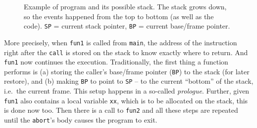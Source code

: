 \documentclass[10pt]{llncs}
\newcommand{\code}[2][]{\lstinline[columns=fullflexible, #1]$#2$}
\newcommand{\codeasm}[2][]{\code[language={[x86masm]Assembler},
	morekeywords={rbp,rsp},#1]{#2}}
\begin{document}
\begin{figure}[tb]
\begin{center}
  \end{center}

  \caption{Example of program and its possible stack. The stack grows down, so
    the events happened from the top to bottom (as well as the code).
    \code{SP} = current stack pointer, \code{BP} = current base/frame
    pointer.}
  \label{fig:stack_frame}
\end{figure}

More precisely, when \code{fun1} is called from \code{main}, the address of
the instruction right after the \codeasm{call} is stored on the stack to know
exactly where to return. And \code{fun1} now continues the execution.
Traditionally, the first thing a function performs is (a) storing the caller's
base/frame pointer (\code{BP}) to the stack (for later restore), and (b)
making \code{BP} to point to \code{SP} -- to the current ``bottom'' of the
stack, i.e.\ the current frame.  This setup happens in a so-called
\emph{prologue}.  Further, given \code{fun1} also contains a local variable
\code{xx}, which is to be allocated on the stack, this is done now too. Then
there is a call to \code{fun2} and all these steps are repeated until the
\code{abort}'s body causes the program to exit.
\end{document}
